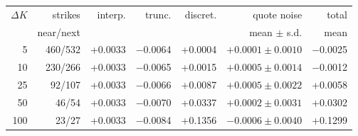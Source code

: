 \begin{tabular}{rrrrrrr}
\toprule
$\Delta K$ & strikes & interp. & trunc. & discret. & quote noise & total \\
 & near/next & & & & mean $\pm$ s.d. & mean \\
\midrule
5 & 460/532 & +0.0033 & \ensuremath{-}0.0064 & +0.0004 & $+0.0001 \pm 0.0010$ & \ensuremath{-}0.0025 \\
10 & 230/266 & +0.0033 & \ensuremath{-}0.0065 & +0.0015 & $+0.0005 \pm 0.0014$ & \ensuremath{-}0.0012 \\
25 & 92/107 & +0.0033 & \ensuremath{-}0.0066 & +0.0087 & $+0.0005 \pm 0.0022$ & +0.0058 \\
50 & 46/54 & +0.0033 & \ensuremath{-}0.0070 & +0.0337 & $+0.0002 \pm 0.0031$ & +0.0302 \\
100 & 23/27 & +0.0033 & \ensuremath{-}0.0084 & +0.1356 & $-0.0006 \pm 0.0040$ & +0.1299 \\
\bottomrule
\end{tabular}
